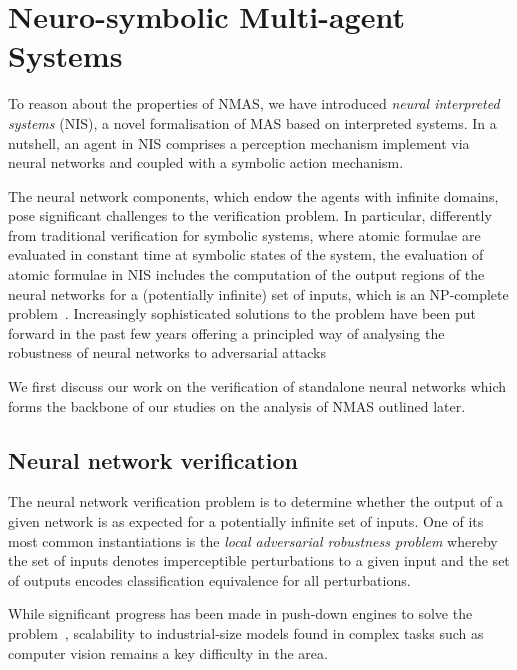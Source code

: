 \documentclass{article}
\begin{document}
\section{Neuro-symbolic Multi-agent Systems}



To reason about the properties of NMAS, we have
introduced {\em neural interpreted systems} (NIS), a novel formalisation of MAS
based on interpreted systems. In a nutshell, an agent in NIS comprises a
perception mechanism implement via neural networks and coupled with a symbolic
action mechanism.  

The neural network components, which endow the agents with infinite domains,
pose significant  challenges to the verification problem.  In particular,
differently from traditional verification for symbolic systems, where atomic
formulae are evaluated in constant time at symbolic states of the system, the
evaluation of atomic formulae in NIS includes the computation of the output
regions of the neural networks  for a (potentially infinite) set of inputs,
which is an NP-complete problem~\cite{Katz+17}. Increasingly sophisticated
solutions to the problem have been put forward in the past few years  offering
a principled way of analysing the robustness of neural networks to adversarial
attacks~\cite{Singh+19,KouvarosLomuscio21,Wang+21}

We first discuss our work on the verification of standalone neural networks
which forms the backbone of our studies on the analysis of  NMAS outlined later.


\subsection{Neural network verification} The neural network verification
problem is to determine whether the output of a given network is as expected for
a potentially infinite set of inputs. One of its most common instantiations is
the {\em local adversarial robustness problem} whereby the set of inputs denotes
imperceptible perturbations to a given input and the set of outputs encodes
classification equivalence for all perturbations.  

While significant progress has been made in push-down engines to solve the
problem~\cite{Brix+23}, scalability to industrial-size models found in complex
tasks such as computer vision remains a key difficulty in the area.  
\end{document}
